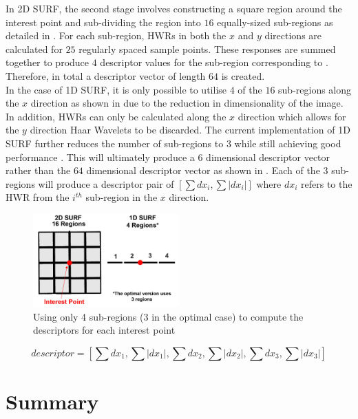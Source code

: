 \documentclass[11pt]{report}
\begin{document}
In 2D SURF, the second stage involves constructing a square region around the interest point and sub-dividing the region into $16$ equally-sized sub-regions as detailed in . For each sub-region, HWRs in both the $x$ and $y$ directions are calculated for $25$ regularly spaced sample points. These responses are summed together to produce $4$ descriptor values for the sub-region corresponding to . Therefore, in total a descriptor vector of length $64$ is created.\\

In the case of 1D SURF, it is only possible to utilise $4$ of the $16$ sub-regions along the $x$ direction as shown in  due to the reduction in dimensionality of the image. In addition, HWRs can only be calculated along the $x$ direction which allows for the $y$ direction Haar Wavelets to be discarded. The current implementation of 1D SURF further reduces the number of sub-regions to $3$ while still achieving good performance \cite{Anderson}. This will ultimately produce a $6$ dimensional descriptor vector rather than the $64$ dimensional descriptor vector as shown in . Each of the $3$ sub-regions will produce a descriptor pair of $[\sum dx_i, \sum |dx_i|]$ where $dx_i$ refers to the HWR from the $i^{th}$ sub-region in the $x$ direction. \\

\begin{figure}[h!] 
  \centering
    \includegraphics[width=0.5\textwidth]{../Drawings/methods/SURF1D_Descriptor.jpg}
    \caption{Using only 4 sub-regions (3 in the optimal case) to compute the descriptors for each interest point}
    \label{fig:subregions4}
\end{figure}


\begin{equation}
descriptor = [ \sum dx_1, \sum |dx_1|,\sum dx_2, \sum |dx_2|,\sum dx_3, \sum |dx_3|] 
\label{eqn:descriptor1d}
\end{equation}

\section{Summary}
\label{sec:summary3}
\end{document}
